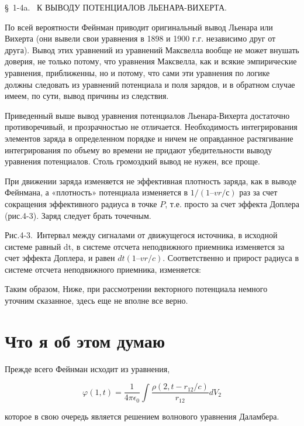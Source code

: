 \documentclass{article}
\begin{document}
§ 1-4a.  К ВЫВОДУ ПОТЕНЦИАЛОВ ЛЬЕНАРА-ВИХЕРТА.

По всей вероятности Фейнман приводит оригинальный вывод Льенара или Вихерта (они вывели свои уравнения в 1898 и 1900 г.г. независимо друг от друга). Вывод этих уравнений из уравнений Максвелла вообще не может внушать доверия, не только потому, что уравнения Максвелла, как и всякие эмпирические уравнения, приближенны, но и потому, что сами эти уравнения по логике должны следовать из уравнений потенциала и поля зарядов, и в обратном случае имеем, по сути, вывод причины из следствия. 

Приведенный выше вывод уравнения потенциалов Льенара-Вихерта достаточно противоречивый, и прозрачностью не отличается. Необходимость интегрирования элементов заряда в определенном порядке и ничем не оправданное растягивание интегрирования по объему во времени не придают убедительности выводу уравнения потенциалов. Столь громоздкий вывод не нужен, все проще. 

При движении заряда изменяется не эффективная плотность заряда, как в выводе Фейнмана, а «плотность» потенциала изменяется в $1/(1 – vr /с)$ раз за счет сокращения эффективного радиуса в точке $P$, т.е. просто за счет эффекта Доплера (рис.4-3). Заряд следует брать точечным. 


Рис.4-3. Интервал между сигналами от движущегося источника, в исходной системе равный dt, в системе отсчета неподвижного приемника изменяется за счет эффекта Доплера, и равен $dt (1 – vr /c)$. Соответственно и прирост радиуса в системе отсчета неподвижного приемника, изменяется: %

Таким образом,
Ниже, при рассмотрении векторного потенциала немного уточним сказанное, здесь еще не вполне все верно.


\section{Что я об этом думаю}

Прежде всего Фейнман исходит из уравнения, 

$$\varphi(1,t) = \frac{1}{4\pi\epsilon_0}\int\frac{\rho(2,t-r_{12}/c)}{r_{12}}dV_{2}$$

которое в свою очередь является решением волнового уравнения Даламбера.

\end{document}
